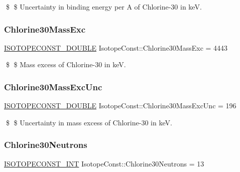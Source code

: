 \$ \$ Uncertainty in binding energy per A of Chlorine-\/30 in keV. \mbox{\label{group___isotope_const-_chlorine-_cl30_gaae42d1a6367601cd4f52793c1c4e9770}} 
\subsubsection{\texorpdfstring{Chlorine30\+Mass\+Exc}{Chlorine30MassExc}}
{\footnotesize\ttfamily \mbox{\hyperlink{group___isotope_const-_macros_ga8f45a7272ce02c0b4c65c44636ed719a}{I\+S\+O\+T\+O\+P\+E\+C\+O\+N\+S\+T\+\_\+\+D\+O\+U\+B\+LE}} Isotope\+Const\+::\+Chlorine30\+Mass\+Exc = 4443}

\$ \$ Mass excess of Chlorine-\/30 in keV. \mbox{\label{group___isotope_const-_chlorine-_cl30_ga536deaa1a04317df3edc76b3e33ac351}} 
\subsubsection{\texorpdfstring{Chlorine30\+Mass\+Exc\+Unc}{Chlorine30MassExcUnc}}
{\footnotesize\ttfamily \mbox{\hyperlink{group___isotope_const-_macros_ga8f45a7272ce02c0b4c65c44636ed719a}{I\+S\+O\+T\+O\+P\+E\+C\+O\+N\+S\+T\+\_\+\+D\+O\+U\+B\+LE}} Isotope\+Const\+::\+Chlorine30\+Mass\+Exc\+Unc = 196}

\$ \$ Uncertainty in mass excess of Chlorine-\/30 in keV. \mbox{\label{group___isotope_const-_chlorine-_cl30_ga7f176edb30d08eea4adda6ae000db454}} 
\subsubsection{\texorpdfstring{Chlorine30\+Neutrons}{Chlorine30Neutrons}}
{\footnotesize\ttfamily \mbox{\hyperlink{group___isotope_const-_macros_ga5f18360b3e99483a35c32d789e62621c}{I\+S\+O\+T\+O\+P\+E\+C\+O\+N\+S\+T\+\_\+\+I\+NT}} Isotope\+Const\+::\+Chlorine30\+Neutrons = 13}

